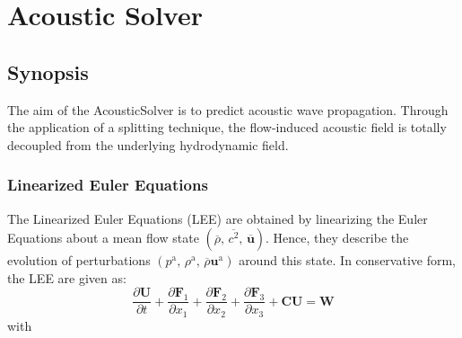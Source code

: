\chapter{Acoustic Solver}

\section{Synopsis}
The aim of the AcousticSolver is to predict acoustic wave propagation.
Through the application of a splitting technique, the flow-induced acoustic field is
totally decoupled from the underlying hydrodynamic field.

\subsection{Linearized Euler Equations}
The Linearized Euler Equations (LEE) are obtained by linearizing the Euler Equations about a mean flow state $\left( \overline{\rho},\,\overline{c^2},\,\overline{\boldsymbol{u}} \right)$.
Hence, they describe the evolution of perturbations $\left(p^\mathrm{a},\,\rho^\mathrm{a},\,\overline{\rho}\boldsymbol{u}^\mathrm{a} \right)$ around this state.
In conservative form, the LEE are given as:
\begin{equation} 
\frac{\partial \boldsymbol{U}}{\partial t}
+ \frac{\partial \boldsymbol{F}_1}{\partial x_1}
+ \frac{\partial \boldsymbol{F}_2}{\partial x_2}
+ \frac{\partial \boldsymbol{F}_3}{\partial x_3}
    + \boldsymbol{C}   \boldsymbol{U}
= \boldsymbol{W}
\end{equation}
with
